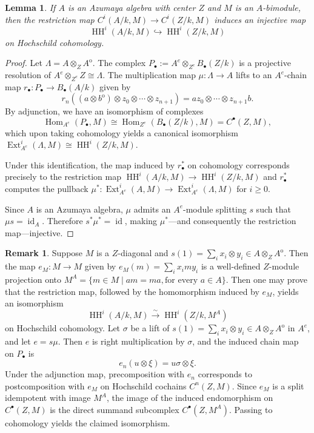 \documentclass[a4paper,11pt,reqno]{amsart}%
\newtheorem{lemma}[theorem]{Lemma}
\theoremstyle{definition}
\newtheorem{remark}[theorem]{Remark}
\newcommand{\HH}{\operatorname{HH}}
\newcommand{\Hom}{\operatorname{Hom}}
\newcommand{\op}{{\operatorname{o}}}
\newcommand{\Ext}{\operatorname{Ext}}
\newcommand{\id}{\operatorname{id}}
\newcommand{\<}{\<}
\renewcommand{\>}{\>}
\numberwithin{equation}{subsection}
\begin{document}
\begin{lemma}\label{lemma:restriction}
If $A$ is an Azumaya algebra with center $Z$ and
$M$ is an $A$-bimodule, then
the restriction map $C^i(A/k, M) \rightarrow C^i(Z/k, M)$ induces an 
injective map
$$
\HH^i(A/k,M) \hookrightarrow 
\HH^i(Z/k,M)
$$
on Hochschild cohomology.
\end{lemma}
\begin{proof}
Let $\Lambda = A\otimes_Z A^\op$. The complex $P_\bullet := A^e\otimes_{Z^e} B_{\bullet}(Z/k)$ is a projective resolution of $A^e\otimes_{Z^e} Z \cong \Lambda$. The multiplication map $\mu: \Lambda \rightarrow A$ lifts to an $A^e$-chain map $r_\bullet: P_\bullet \rightarrow B_\bullet(A/k)$ given by
$$
r_n((a\otimes b^\op)\otimes z_0 \otimes \cdots \otimes z_{n+1}) = a z_0\otimes \cdots \otimes z_{n+1}b.
$$
By adjunction, we have an isomorphism of complexes
$$
\Hom_{A^e}(P_\bullet, M) \cong \Hom_{Z^e}(B_\bullet(Z/k), M) = C^\bullet(Z, M),
$$
which upon taking cohomology yields a canonical isomorphism $\Ext^i_{A^e}(\Lambda, M) \cong \HH^i(Z/k, M)$. 

Under this identification, the map induced by $r_\bullet^*$ on cohomology corresponds precisely to the restriction map 
$\HH^i(A/k, M) \rightarrow \HH^i(Z/k, M)$ and $r_\bullet^*$ computes the pullback $\mu^*: \Ext^i_{A^e}(A, M) \rightarrow \Ext^i_{A^e}(\Lambda, M)$
for $i\geq 0$.

Since $A$ is an Azumaya algebra, $\mu$ admits an $A^e$-module splitting $s$ such that $\mu s = \id_A$. Therefore $s^* \mu^* = \id$, making $\mu^*$—and consequently the restriction map—injective.
\end{proof}

\begin{remark}
Suppose $M$ is a $Z$-diagonal and $s(1) = \sum_i x_i \otimes y_i\in A \otimes_Z A^\op$. Then the map $e_M: M \rightarrow M$ given by $e_M(m) = \sum_i x_i m y_i$ 
is a well-defined $Z$-module projection onto $M^A = \{m\in M \mid a m = m a, \text{for every }a\in A\}$. Then one may prove that the restriction map, 
followed by the homomorphism induced by $e_M$, yields an 
isomorphism
$$
\HH^i(A/k, M) \xrightarrow{\sim} \HH^i(Z/k, M^A)
$$
on Hochschild cohomology. Let $\sigma$ be a lift of $s(1) = \sum_i x_i \otimes y_i\in A \otimes_Z A^\op$ in $A^e$, and let $e = s \mu$. Then $e$ is right multiplication by $\sigma$, and the induced chain map on $P_\bullet$ is
$$
e_n(u\otimes \xi) = u \sigma \otimes \xi.
$$
Under the adjunction map, precomposition with $e_n$ corresponds to postcomposition with $e_M$ on Hochschild cochains $C^n(Z, M)$. 
Since $e_M$ is a split idempotent with image $M^A$, the image of the induced 
endomorphism on $C^\bullet(Z, M)$ is the direct summand subcomplex $C^\bullet(Z, M^A)$. Passing to 
cohomology yields the claimed isomorphism.
\end{remark}
\end{document}
